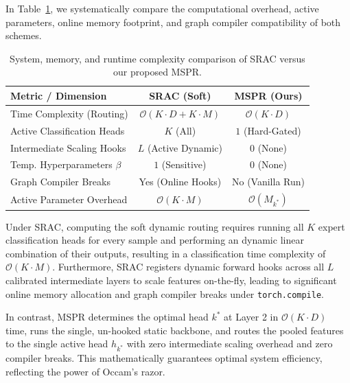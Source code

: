 \documentclass{article}
\theoremstyle{plain}
\theoremstyle{definition}
\theoremstyle{remark}
\begin{document}
In Table~\ref{table-complexity}, we systematically compare the computational overhead, active parameters, online memory footprint, and graph compiler compatibility of both schemes.

\begin{table}[t]
\caption{System, memory, and runtime complexity comparison of SRAC versus our proposed MSPR.}
\label{table-complexity}
\vskip 0.05in
\begin{center}
\begin{footnotesize}
\setlength{\tabcolsep}{12pt}
\begin{tabular}{lcc}
\toprule
Metric / Dimension & SRAC (Soft) & MSPR (Ours) \\
\midrule
Time Complexity (Routing) & $\mathcal{O}(K \cdot D + K \cdot M)$ & $\mathcal{O}(K \cdot D)$ \\
Active Classification Heads & $K$ (All) & $1$ (Hard-Gated) \\
Intermediate Scaling Hooks & $L$ (Active Dynamic) & $0$ (None) \\
Temp. Hyperparameters $\beta$ & $1$ (Sensitive) & $0$ (None) \\
Graph Compiler Breaks & Yes (Online Hooks) & No (Vanilla Run) \\
Active Parameter Overhead & $\mathcal{O}(K \cdot M)$ & $\mathcal{O}(M_{k^*})$ \\
\bottomrule
\end{tabular}
\end{footnotesize}
\end{center}
\vskip -0.15in
\end{table}

Under SRAC, computing the soft dynamic routing requires running all $K$ expert classification heads for every sample and performing an dynamic linear combination of their outputs, resulting in a classification time complexity of $\mathcal{O}(K \cdot M)$. Furthermore, SRAC registers dynamic forward hooks across all $L$ calibrated intermediate layers to scale features on-the-fly, leading to significant online memory allocation and graph compiler breaks under \texttt{torch.compile}. 

In contrast, MSPR determines the optimal head $k^*$ at Layer 2 in $\mathcal{O}(K \cdot D)$ time, runs the single, un-hooked static backbone, and routes the pooled features to the single active head $h_{k^*}$ with zero intermediate scaling overhead and zero compiler breaks. This mathematically guarantees optimal system efficiency, reflecting the power of Occam's razor.
\end{document}
